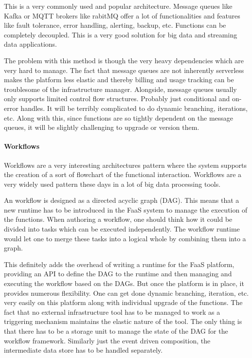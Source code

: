 \documentclass[12pt,titlepage]{article}
\begin{document}
This is a very commonly used and popular architecture. Message queues like Kafka
or MQTT brokers like rabitMQ offer a lot of functionalities and features like
fault tolerance, error handling, alerting, backup, etc. Functions can be
completely decoupled. This is a very good solution for big data and streaming
data applications.

The problem with this method is though the very heavy dependencies which are
very hard to manage. The fact that message queues are not inherently serverless
makes the platform less elastic and thereby billing and usage tracking can be
troublesome of the infrastructure manager. Alongside, message queues usually
only supports limited control flow structures. Probably just conditional and
on-error handles. It will be terribly complicated to do dynamic branching,
iterations, etc. Along with this, since functions are so tightly dependent on
the message queues, it will be slightly challenging to upgrade or version them. 

\paragraph{Workflows}
\label{sec:org60e0d5d}

Workflows are a very interesting architectures pattern where the system supports
the creation of a sort of flowchart of the functional interaction. Workflows are
a very widely used pattern these days in a lot of big data processing tools. 

An workflow is designed as a directed acyclic graph (DAG). This means that a new
runtime has to be introduced in the FaaS system to manage the execution of the
functions. When authoring a workflow, one should think how it could be divided
into tasks which can be executed independently. The workflow runtime would let
one to merge these tasks into a logical whole by combining them into a graph.

This definitely adds the overhead of writing a runtime for the FaaS platform,
providing an API to define the DAG to the runtime and then managing and
executing the workflow based on the DAGs. But once the platform is in place, it
provides numerous flexibility. One can get done dynamic branching, iteration,
etc. very easily on this platform along with individual upgrade of the
functions. The fact that no external infrastructure tool has to be managed to
work as a triggering mechanism maintains the elastic nature of the tool. The
only thing is that there has to be a storage unit to manage the state of the DAG
for the workflow framework. Similarly just the event driven composition, the
intermediate data store has to be handled separately.
\end{document}
